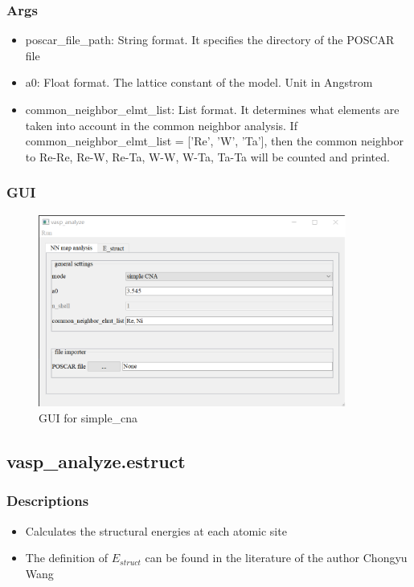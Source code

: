 \documentclass[12pt]{book}
\begin{document}
\subsubsection{Args}
\begin{itemize}
\item poscar\_file\_path: String format. It specifies the directory of the POSCAR file
\item a0: Float format. The lattice constant of the model. Unit in Angstrom
\item common\_neighbor\_elmt\_list: List format. It determines what elements are taken into account in the common neighbor analysis. If common\_neighbor\_elmt\_list = ['Re', 'W', 'Ta'], then the common neighbor to Re-Re, Re-W, Re-Ta, W-W, W-Ta, Ta-Ta will be counted and printed.
\end{itemize}

\subsubsection{GUI}
\begin{figure}[htbp]
\centering
\includegraphics[width=0.9\textwidth]{gui_simple_cna.pdf}
\caption{GUI for simple\_cna}
\label{fig:GUI_simple_cna}
\end{figure}

\subsection{vasp\_analyze.estruct}
\subsubsection{Descriptions}
\begin{itemize}
\item Calculates the structural energies at each atomic site
\item The definition of $E_{struct}$ can be found in the literature of the author Chongyu Wang \cite{Chongyu1988PRB38, Chong-yu1990PRB41}
\end{itemize}
\end{document}
